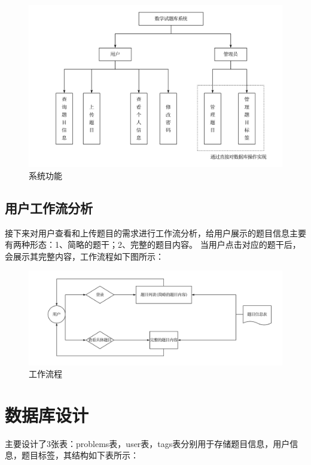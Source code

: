 \documentclass[a4paper,AutoFakeBold={2.7}]{ctexart} %
\begin{document}
\begin{figure}[H]
	\centering
	\includegraphics[width=\linewidth]{./图片/系统功能.pdf}
	\caption{系统功能}\label{系统功能}
\end{figure}

\subsection{用户工作流分析}

接下来对用户查看和上传题目的需求进行工作流分析，给用户展示的题目信息主要有两种形态：1、简略的题干；2、完整的题目内容。
当用户点击对应的题干后，会展示其完整内容，工作流程如下图所示：

\begin{figure}[H]
	\centering
	\includegraphics[width=\linewidth]{./图片/工作流程.pdf}
	\caption{工作流程}\label{工作流程}
\end{figure}

\section{数据库设计}

主要设计了3张表：problems表，user表，tags表分别用于存储题目信息，用户信息，题目标签，其结构如下表所示：
\end{document}
